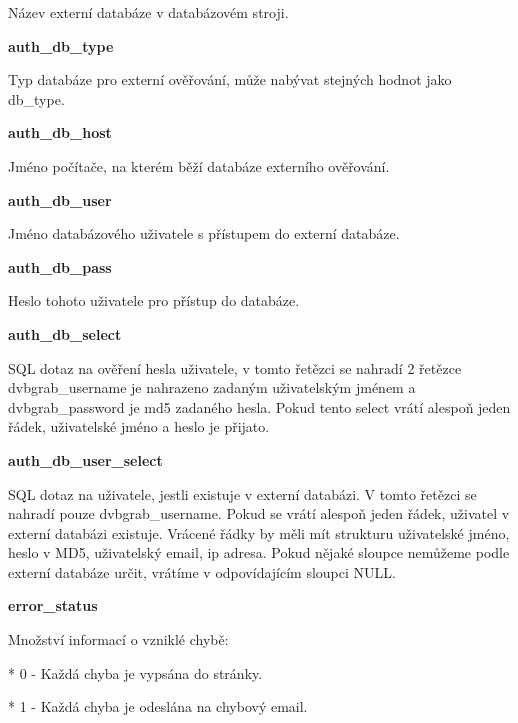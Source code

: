 Název externí databáze v databázovém stroji.

\vspace{10pt}

\textbf{auth\_db\_type}

Typ databáze pro externí ověřování, může nabývat stejných hodnot jako db\_type.

\vspace{10pt}

\textbf{auth\_db\_host}

Jméno počítače, na kterém běží databáze externího ověřování.

\vspace{10pt}

\textbf{auth\_db\_user}

Jméno databázového uživatele s přístupem do externí databáze.

\vspace{10pt}

\textbf{auth\_db\_pass}

Heslo tohoto uživatele pro přístup do databáze.

\vspace{10pt}

\textbf{auth\_db\_select}

SQL dotaz na ověření hesla uživatele, v tomto řetězci se nahradí 2 řetězce dvbgrab\_username je nahrazeno zadaným uživatelským jménem a dvbgrab\_password je md5 zadaného hesla. Pokud tento select vrátí alespoň jeden řádek, uživatelské jméno a heslo je přijato.

\vspace{10pt}

\textbf{auth\_db\_user\_select}

SQL dotaz na uživatele, jestli existuje v externí databázi. V tomto řetězci se nahradí pouze dvbgrab\_username. Pokud se vrátí alespoň jeden řádek, uživatel v externí databázi existuje. Vrácené řádky by měli mít strukturu uživatelské jméno, heslo v MD5, uživatelský email, ip adresa. Pokud nějaké sloupce nemůžeme podle externí databáze určit, vrátíme v odpovídajícím sloupci NULL.

\vspace{10pt}

\textbf{error\_status}

Množství informací o vzniklé chybě:

* 0 - Každá chyba je vypsána do stránky.

* 1 - Každá chyba je odeslána na chybový email.

